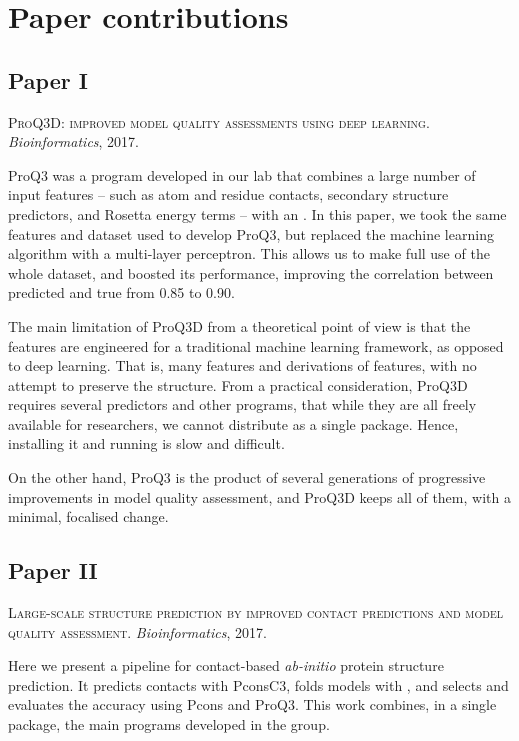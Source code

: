 \chapter{Paper contributions}

\section*{Paper \textcolor[cmyk]{0, 0.87, 0.68, 0.32}{I}}
\begin{center}
	\textsc{ProQ3D: improved model quality assessments using deep learning.}
	\emph{Bioinformatics}, 2017.
\end{center}
\noindent
ProQ3 \citep{ProQ3} was a \MQA{} program developed in our lab that combines a large number of input features -- such as atom and residue contacts, secondary structure predictors, and Rosetta energy terms -- with an \SVM.
In this paper, we took the same features and dataset used to develop ProQ3, but replaced the machine learning algorithm with a multi-layer perceptron.
This allows us to make full use of the whole dataset, and boosted its performance, improving the correlation between predicted and true from 0.85 to 0.90.

The main limitation of ProQ3D from a theoretical point of view is that the features are engineered for a traditional machine learning framework, as opposed to deep learning.
That is, many features and derivations of features, with no attempt to preserve the structure.
From a practical consideration, ProQ3D requires several predictors and other programs, that while they are all freely available for researchers, we cannot distribute as a single package. Hence, installing it and running is slow and difficult.

On the other hand, ProQ3 is the product of several generations of progressive improvements in model quality assessment, and ProQ3D keeps all of them, with a minimal, focalised change. 

\section*{Paper  \textcolor[cmyk]{0, 0.87, 0.68, 0.32}{II}}
\begin{center}
	\textsc{Large-scale structure prediction by improved contact predictions and model quality assessment.}
	\emph{Bioinformatics}, 2017.
\end{center}

\noindent
Here we present a pipeline for contact-based \emph{ab-initio} protein structure prediction.
It predicts contacts with PconsC3, folds models with \CONFOLD, and selects and evaluates the accuracy using Pcons and ProQ3.
This work combines, in a single package, the main programs developed in the group.


